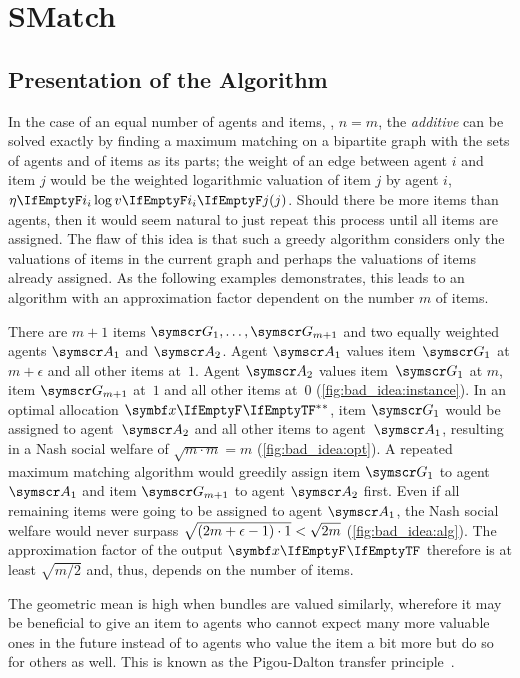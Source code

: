 \section{SMatch}
\label{sec:smatch}

\subsection{Presentation of the Algorithm}
\label{subsec:smatch:presentation}

In the case of an equal number of agents and items, \ie, \(n = m\), the \emph{additive} \NSW{} can be solved exactly by finding a maximum matching on a bipartite graph with the sets of agents and of items as its parts;
the weight of an edge between agent \(i\) and item \(j\) would be the weighted logarithmic valuation of item \(j\) by agent \(i\), \ie{} \(\weight \log \valuations[j]\).
Should there be more items than agents, then it would seem natural to just repeat this process until all items are assigned.
The flaw of this idea is that such a greedy algorithm considers only the valuations of items in the current graph and perhaps the valuations of items already assigned.
As the following examples demonstrates, this leads to an algorithm with an approximation factor dependent on the number \(m\) of items.
\begin{example}
	\label{ex:bad_idea}
	There are \(m+1\) items \(\goods_{1}, \dots, \goods_{m+1}\) and two equally weighted agents \(\agents_{1}\) and \(\agents_{2}\).
	Agent \(\agents_{1}\) values item~\(\goods_{1}\) at \(m + \epsilon\) and all other items at~\(1\).
	Agent \(\agents_{2}\) values item~\(\goods_{1}\) at \(m\), item \(\goods_{m+1}\) at~\(1\) and all other items at~\(0\) (\cref{fig:bad_idea:instance}).
	In an optimal allocation \(\alloc*[][]\), item \(\goods_{1}\) would be assigned to agent~\(\agents_{2}\) and all other items to agent~\(\agents_{1}\), resulting in a Nash social welfare of \(\sqrt{m \cdot m} = m\) (\cref{fig:bad_idea:opt}).
	A repeated maximum matching algorithm would greedily assign item \(\goods_{1}\) to agent \(\agents_{1}\) and item \(\goods_{m+1}\) to agent \(\agents_{2}\) first.
	Even if all remaining items were going to be assigned to agent \(\agents_{1}\), the Nash social welfare would never surpass \(\smash{\sqrt{(2m + \epsilon - 1) \cdot 1}} < \sqrt{2m}\) (\cref{fig:bad_idea:alg}).
	The approximation factor of the output \(\alloc[][]\) therefore is at least \(\sqrt{m/2}\) and, thus, depends on the number of items.
\end{example}
The geometric mean is high when bundles are valued similarly, wherefore it may be beneficial to give an item to agents who cannot expect many more valuable ones in the future instead of to agents who value the item a bit more but do so for others as well.
This is known as the Pigou-Dalton transfer principle~\cite{sublin_approx_algo_for_nsw_with_xos_valuations}.

